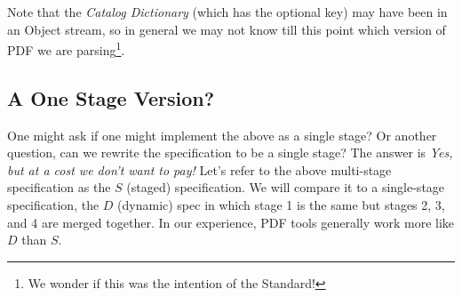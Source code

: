 Note that the \emph{Catalog Dictionary} (which has the optional
 key) may have been in an Object stream, so in general
we may not know till this point which version of PDF we are
parsing\footnote{We wonder if this was the intention of the Standard!}.

\subsection{A One Stage Version?}
\label{sec:single-pass-problems}

\newcommand{\ssp}{$S$}
\newcommand{\dsp}{$D$}

One might ask if one might implement the above as a single stage?
Or another question, can we rewrite the specification to be a single stage?
The answer is \emph{Yes, but at a cost we don't want to pay!}
Let's refer to the above multi-stage specification as the \ssp{}
(staged) specification.
%
We will compare it to a single-stage specification, the \dsp{}
(dynamic) spec in which stage 1 is the same but stages 2, 3, and 4 are
merged together.
%
In our experience, PDF tools generally work more like \dsp{} than \ssp{}.

